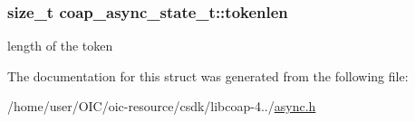 \subsubsection[{tokenlen}]{\setlength{\rightskip}{0pt plus 5cm}size\+\_\+t coap\+\_\+async\+\_\+state\+\_\+t\+::tokenlen}\label{structcoap__async__state__t_a9ac15543c19c679be1f77442671454fb}
length of the token 

The documentation for this struct was generated from the following file\+:\begin{DoxyCompactItemize}
\item 
/home/user/\+O\+I\+C/oic-\/resource/csdk/libcoap-\/4../\hyperlink{async_8h}{async.\+h}\end{DoxyCompactItemize}
